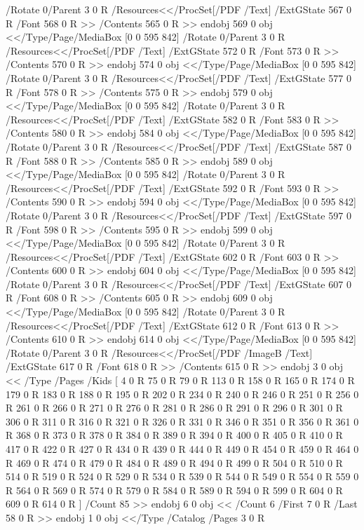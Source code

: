 {{{{{{{{{{{{{{{{{{{{{{{{{{{{/Rotate 0/Parent 3 0 R
/Resources<</ProcSet[/PDF /Text]
/ExtGState 567 0 R
/Font 568 0 R
>>
/Contents 565 0 R
>>
endobj
569 0 obj
<</Type/Page/MediaBox [0 0 595 842]
/Rotate 0/Parent 3 0 R
/Resources<</ProcSet[/PDF /Text]
/ExtGState 572 0 R
/Font 573 0 R
>>
/Contents 570 0 R
>>
endobj
574 0 obj
<</Type/Page/MediaBox [0 0 595 842]
/Rotate 0/Parent 3 0 R
/Resources<</ProcSet[/PDF /Text]
/ExtGState 577 0 R
/Font 578 0 R
>>
/Contents 575 0 R
>>
endobj
579 0 obj
<</Type/Page/MediaBox [0 0 595 842]
/Rotate 0/Parent 3 0 R
/Resources<</ProcSet[/PDF /Text]
/ExtGState 582 0 R
/Font 583 0 R
>>
/Contents 580 0 R
>>
endobj
584 0 obj
<</Type/Page/MediaBox [0 0 595 842]
/Rotate 0/Parent 3 0 R
/Resources<</ProcSet[/PDF /Text]
/ExtGState 587 0 R
/Font 588 0 R
>>
/Contents 585 0 R
>>
endobj
589 0 obj
<</Type/Page/MediaBox [0 0 595 842]
/Rotate 0/Parent 3 0 R
/Resources<</ProcSet[/PDF /Text]
/ExtGState 592 0 R
/Font 593 0 R
>>
/Contents 590 0 R
>>
endobj
594 0 obj
<</Type/Page/MediaBox [0 0 595 842]
/Rotate 0/Parent 3 0 R
/Resources<</ProcSet[/PDF /Text]
/ExtGState 597 0 R
/Font 598 0 R
>>
/Contents 595 0 R
>>
endobj
599 0 obj
<</Type/Page/MediaBox [0 0 595 842]
/Rotate 0/Parent 3 0 R
/Resources<</ProcSet[/PDF /Text]
/ExtGState 602 0 R
/Font 603 0 R
>>
/Contents 600 0 R
>>
endobj
604 0 obj
<</Type/Page/MediaBox [0 0 595 842]
/Rotate 0/Parent 3 0 R
/Resources<</ProcSet[/PDF /Text]
/ExtGState 607 0 R
/Font 608 0 R
>>
/Contents 605 0 R
>>
endobj
609 0 obj
<</Type/Page/MediaBox [0 0 595 842]
/Rotate 0/Parent 3 0 R
/Resources<</ProcSet[/PDF /Text]
/ExtGState 612 0 R
/Font 613 0 R
>>
/Contents 610 0 R
>>
endobj
614 0 obj
<</Type/Page/MediaBox [0 0 595 842]
/Rotate 0/Parent 3 0 R
/Resources<</ProcSet[/PDF /ImageB /Text]
/ExtGState 617 0 R
/Font 618 0 R
>>
/Contents 615 0 R
>>
endobj
3 0 obj
<< /Type /Pages /Kids [
4 0 R
75 0 R
79 0 R
113 0 R
158 0 R
165 0 R
174 0 R
179 0 R
183 0 R
188 0 R
195 0 R
202 0 R
234 0 R
240 0 R
246 0 R
251 0 R
256 0 R
261 0 R
266 0 R
271 0 R
276 0 R
281 0 R
286 0 R
291 0 R
296 0 R
301 0 R
306 0 R
311 0 R
316 0 R
321 0 R
326 0 R
331 0 R
346 0 R
351 0 R
356 0 R
361 0 R
368 0 R
373 0 R
378 0 R
384 0 R
389 0 R
394 0 R
400 0 R
405 0 R
410 0 R
417 0 R
422 0 R
427 0 R
434 0 R
439 0 R
444 0 R
449 0 R
454 0 R
459 0 R
464 0 R
469 0 R
474 0 R
479 0 R
484 0 R
489 0 R
494 0 R
499 0 R
504 0 R
510 0 R
514 0 R
519 0 R
524 0 R
529 0 R
534 0 R
539 0 R
544 0 R
549 0 R
554 0 R
559 0 R
564 0 R
569 0 R
574 0 R
579 0 R
584 0 R
589 0 R
594 0 R
599 0 R
604 0 R
609 0 R
614 0 R
] /Count 85
>>
endobj
6 0 obj
<< /Count 6 /First 7 0 R /Last 58 0 R >>
endobj
1 0 obj
<</Type /Catalog /Pages 3 0 R
}}}}}}}}}}}}}}}}}}}}}}}}}}}}
